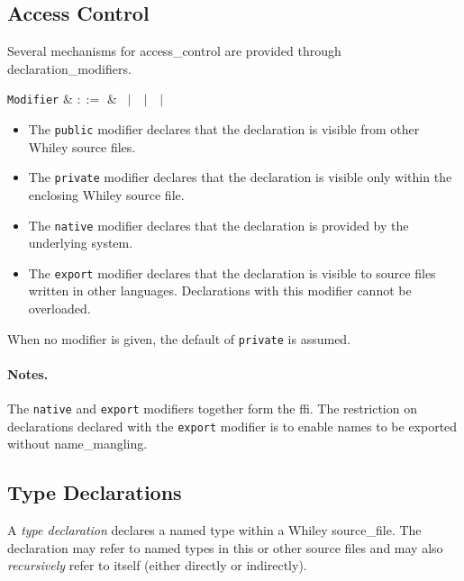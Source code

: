 \subsection{Access Control}

Several mechanisms for \gls{access_control} are provided through \glspl{declaration_modifier}.

\begin{syntax}
\verb+Modifier+ & $::=$ & \ $|$\ \ $|$\ \ $|$\ \\
\end{syntax}

\begin{itemize}
\item The \lstinline{public} modifier declares that the \gls{declaration} is visible from other Whiley source files.
\item The \lstinline{private} modifier declares that the \gls{declaration} is visible only within the enclosing Whiley source file.
\item The \lstinline{native} modifier declares that the \gls{declaration} is provided by the underlying system.
\item The \lstinline{export} modifier declares that the \gls{declaration} is visible to source files written in other languages.  Declarations with this modifier cannot be overloaded.
\end{itemize}

\noindent When no modifier is given, the default of \lstinline{private} is assumed.  

\paragraph{Notes.} The \lstinline{native} and \lstinline{export} modifiers together form the \gls{ffi}.  The restriction on declarations declared with the \lstinline{export} modifier is to enable names to be exported without \gls{name_mangling}.


\subsection{Type Declarations}
\label{c_source_files_type_decl}

A {\em type declaration} declares a named type within a Whiley \gls{source_file}.  The declaration may refer to named types in this or other source files and may also {\em recursively} refer to itself (either directly or indirectly).

